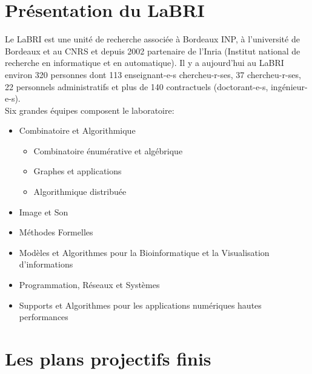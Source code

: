 \documentclass[a4paper]{article}
\begin{document}
\section{Présentation du LaBRI}
Le LaBRI est une unité de recherche associée à Bordeaux INP, à l'université de Bordeaux et au CNRS et depuis 2002 partenaire de l'Inria (Institut national de recherche en informatique et en automatique). Il y a aujourd'hui au LaBRI environ 320 personnes dont 113 enseignant-e-s chercheu-r-ses, 37 chercheu-r-ses, 22 personnels administratifs et plus de 140 contractuels (doctorant-e-s, ingénieur-e-s).\vspace{1\baselineskip}\\
Six grandes équipes composent le laboratoire:
\begin{itemize}
\item Combinatoire et Algorithmique
  \begin{itemize}
  \item Combinatoire énumérative et algébrique
  \item Graphes et applications
  \item Algorithmique distribuée
    \end{itemize}
\item Image et Son
\item Méthodes Formelles
\item Modèles et Algorithmes pour la Bioinformatique et la Visualisation d'informations
\item Programmation, Réseaux et Systèmes
\item Supports et Algorithmes pour les applications numériques hautes performances
  \end{itemize}
\newpage
\section{Les plans projectifs finis}
\end{document}

